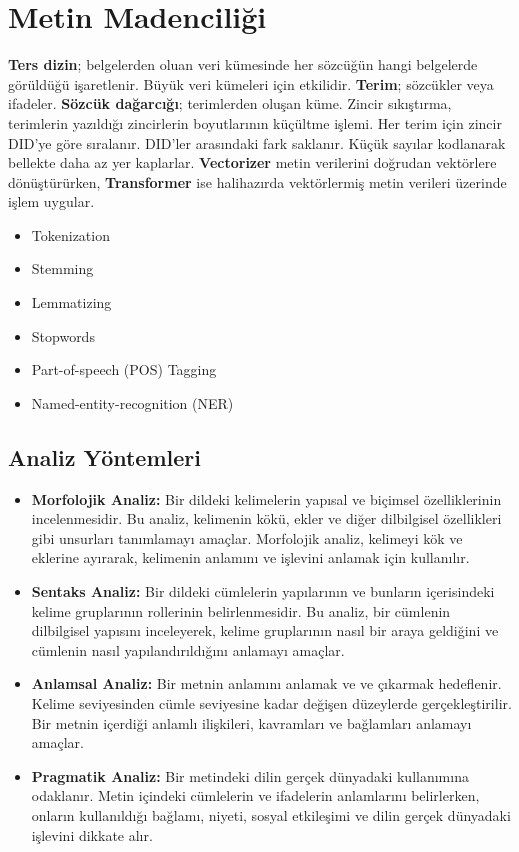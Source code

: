\section{Metin Madenciliği}
\textbf{Ters dizin}; belgelerden oluan veri kümesinde her sözcüğün hangi belgelerde görüldüğü işaretlenir. Büyük veri kümeleri için etkilidir. \textbf{Terim}; sözcükler veya ifadeler. \textbf{Sözcük dağarcığı}; terimlerden oluşan küme. Zincir sıkıştırma, terimlerin yazıldığı zincirlerin boyutlarının küçültme işlemi. Her terim için zincir DID'ye göre sıralanır. DID'ler arasındaki fark saklanır. Küçük sayılar kodlanarak bellekte daha az yer kaplarlar. \textbf{Vectorizer} metin verilerini doğrudan vektörlere dönüştürürken, \textbf{Transformer} ise halihazırda vektörlermiş metin verileri üzerinde işlem uygular.

\begin{itemize}
    \item Tokenization
    \item Stemming
    \item Lemmatizing
    \item Stopwords
    \item Part-of-speech (POS) Tagging
    \item Named-entity-recognition (NER)
\end{itemize}

\subsection{Analiz Yöntemleri}
\begin{itemize}
    \item \textbf{Morfolojik Analiz:} Bir dildeki kelimelerin yapısal ve biçimsel özelliklerinin incelenmesidir. Bu analiz, kelimenin kökü, ekler ve diğer dilbilgisel özellikleri gibi unsurları tanımlamayı amaçlar. Morfolojik analiz, kelimeyi kök ve eklerine ayırarak, kelimenin anlamını ve işlevini anlamak için kullanılır.
    \item \textbf{Sentaks Analiz:} Bir dildeki cümlelerin yapılarının ve bunların içerisindeki kelime gruplarının rollerinin belirlenmesidir. Bu analiz, bir cümlenin dilbilgisel yapısını inceleyerek, kelime gruplarının nasıl bir araya geldiğini ve cümlenin nasıl yapılandırıldığını anlamayı amaçlar.
    \item \textbf{Anlamsal Analiz:} Bir metnin anlamını anlamak ve ve çıkarmak hedeflenir. Kelime seviyesinden cümle seviyesine kadar değişen düzeylerde gerçekleştirilir. Bir metnin içerdiği anlamlı ilişkileri, kavramları ve bağlamları anlamayı amaçlar.
    \item \textbf{Pragmatik Analiz:} Bir metindeki dilin gerçek dünyadaki kullanımına odaklanır. Metin içindeki cümlelerin ve ifadelerin anlamlarını belirlerken, onların kullanıldığı bağlamı, niyeti, sosyal etkileşimi ve dilin gerçek dünyadaki işlevini dikkate alır.
\end{itemize}

